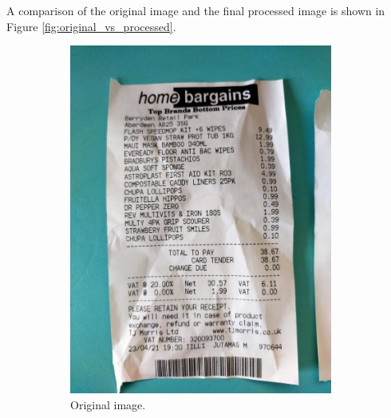 \documentclass[
  digital, %
  table,   %
  oneside, %
  lof,     %
  lot,     %
]{fithesis3}
\newcommand\half{0.45}
\newcommand\subfigsize{0.95}
\begin{document}
    A comparison of the original image and the final processed image is shown in Figure \ref{fig:original_vs_processed}.
    
    \begin{figure}
        \centering
        \begin{subfigure}[t]{\half\textwidth}
          \centering
          \includegraphics[width=\subfigsize\textwidth]{figures/image_processing/original_image}
          \caption{Original image.}
        \end{subfigure}
        \begin{subfigure}[t]{\half\textwidth}
          \centering

\end{subfigure}
\end{figure}
\end{document}

